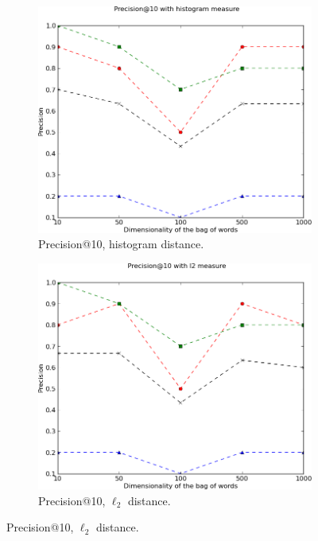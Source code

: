 \documentclass[a4paper,10pt,twoside]{article}
\begin{document}
\begin{figure}
  \begin{subfigure}{0.47\textwidth}
    \centering
    \includegraphics[width=\textwidth]{p10h}
    \caption{Precision@10, histogram distance.}
  \end{subfigure}
  \hspace*{\fill}
  \begin{subfigure}{0.47\textwidth}
    \centering
    \includegraphics[width=\textwidth]{p10l}
    \caption{Precision@10, $\ell_2$ distance.}
  \end{subfigure}
  \begin{center}

\end{center}
\end{figure}
\end{document}
